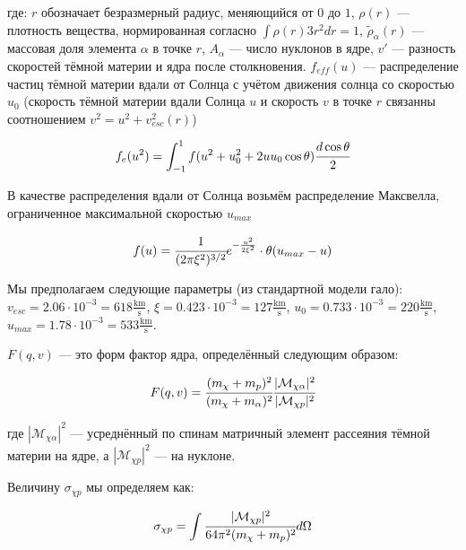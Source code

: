 где: $r$ обозначает безразмерный радиус, меняющийся от $0$ до $1$, $\rho(r)$ --- плотность вещества, нормированная согласно $\int \rho(r) 3r^2 dr = 1$, $\tilde{\rho}_{\alpha}(r)$ --- массовая доля элемента $\alpha$ в точке $r$, $A_{\alpha}$ --- число нуклонов в ядре, $v'$ --- разность скоростей тёмной материи и ядра после столкновения. $f_{eff}(u)$ --- распределение частиц тёмной материи вдали от Солнца с учётом движения солнца со скоростью $u_0$ (скорость тёмной материи вдали Солнца $u$ и скорость $v$ в точке $r$ связанны соотношением $v^2 = u^2 + v_{esc}^2(r)$)

\begin{equation}
	f_e(u^2) = \int_{-1}^1 {f(u^2+u^2_0 + 2 u u_0 \cos{\theta}) \cfrac{d\cos{\theta}}{2}}
\end{equation}

В качестве распределения вдали от Солнца возьмём распределение Максвелла, ограниченное максимальной скоростью $u_{max}$

\begin{equation}
	f(u)  = \cfrac{1}{(2\pi \xi^2)^{3/2}} e^{-\frac{u^2}{2 \xi^2}} \cdot \theta(u_{max} - u )
\end{equation}

Мы предполагаем следующие параметры (из стандартной модели гало):
$v_{esc} = 2.06 \cdot 10^{-3} = 618 \frac{\text{km}}{\text{s}}$, $\xi = 0.423 \cdot 10^{-3} = 127 \frac{\text{km}}{\text{s}}$, $u_0 = 0.733 \cdot 10^{-3} = 220 \frac{\text{km}}{\text{s}}$, $u_{max} = 1.78 \cdot 10^{-3} = 533 \frac{\text{km}}{\text{s}}$.

$F(q,v)$ --- это форм фактор ядра, определённый следующим образом:

\begin{equation}
	\label{eq::ff_def}
	F(q,v) = \cfrac{(m_{\chi} + m_{p})^2}{(m_{\chi} + m_{\alpha})^2}
	\cfrac{|\mathcal{M}_{\chi \alpha}|^2}
	{|\mathcal{M}_{\chi p}|^2}
\end{equation}

где $|\mathcal{M}_{\chi \alpha}|^2$ --- усреднённый по спинам матричный элемент рассеяния тёмной материи на ядре, а $|\mathcal{M}_{\chi p}|^2$ --- на нуклоне.

Величину $\sigma_{\chi p}$ мы определяем как:

\begin{equation}
	\label{eq:sigma_def}
	\sigma_{\chi p} = \int {\cfrac{|\mathcal{M}_{\chi p}|^2}{64\pi^2 (m_{\chi} + m_p)^2} d\Omega}
\end{equation}



